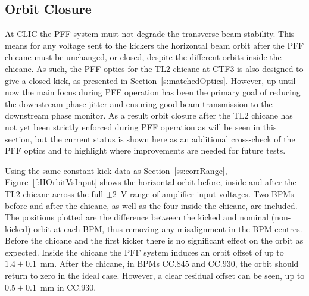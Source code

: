 \subsection{Orbit Closure}
\label{ss:orbitClosure}

At CLIC the PFF system must not degrade the transverse beam stability. This means for any voltage sent to the kickers the horizontal beam orbit after the PFF chicane must be unchanged, or closed, despite the different orbits inside the chicane. As such, the PFF optics for the TL2 chicane at CTF3 is also designed to give a closed kick, as presented in Section~\ref{s:matchedOptics}. However, up until now the main focus during PFF operation has been the primary goal of reducing the downstream phase jitter and ensuring good beam transmission to the downstream phase monitor. As a result orbit closure after the TL2 chicane has not yet been strictly enforced during PFF operation as will be seen in this section, but the current status is shown here as an additional cross-check of the PFF optics and to highlight where improvements are needed for future tests.

Using the same constant kick data as Section~\ref{ss:corrRange}, Figure~\ref{f:HOrbitVsInput} shows the horizontal orbit before, inside and after the TL2 chicane across the full \(\pm2\)~V range of amplifier input voltages. Two BPMs before and after the chicane, as well as the four inside the chicane, are included. The positions plotted are the difference between the kicked and nominal (non-kicked) orbit at each BPM, thus removing any misalignment in the BPM centres. Before the chicane and the first kicker there is no significant effect on the orbit as expected. Inside the chicane the PFF system induces an orbit offset of up to \(1.4\pm0.1\)~mm. After the chicane, in BPMs CC.845 and CC.930, the orbit should return to zero in the ideal case. However, a clear residual offset can be seen, up to \(0.5\pm0.1\)~mm in CC.930.

